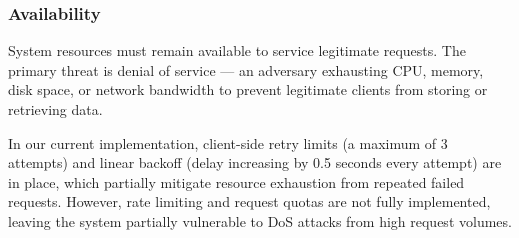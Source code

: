 \documentclass[../veristore_security_model.tex]{subfiles}
\begin{document}
\subsubsection{Availability}
\vspace{-1.5em}

System resources must remain available to service legitimate requests. The primary threat is denial of service — an adversary exhausting CPU, memory, disk space, or network bandwidth to prevent legitimate clients from storing or retrieving data. 

In our current implementation, client-side retry limits (a maximum of 3 attempts) and linear backoff (delay increasing by 0.5 seconds every attempt) are in place, which partially mitigate resource exhaustion from repeated failed requests. However, rate limiting and request quotas are not fully implemented, leaving the system partially vulnerable to DoS attacks from high request volumes.

\newpage
\end{document}
